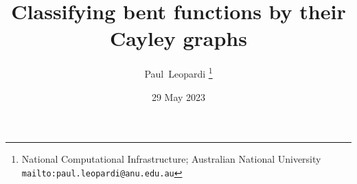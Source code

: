 \documentclass[12pt,a4paper]{article}
\title{Classifying bent functions by their Cayley graphs}
\author{
Paul~Leopardi
\thanks{National Computational Infrastructure; Australian National University
\protect\texttt{mailto:paul.\-leopardi@anu.edu.au}}
}
\date{29 May 2023}
\begin{document}
\maketitle

\begin{abstract}

\end{abstract}


\end{document}
